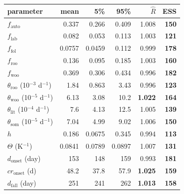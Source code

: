 \begin{tabular}[t]{lrrrrr}
\toprule
parameter & mean & 5\% & 95\% & $\hat R$ & ESS \\
\midrule
$f_\text{auto}$ & 0.337 & 0.266 & 0.409 & 1.008 & \textbf{150} \\
$f_\text{lab}$ & 0.082 & 0.053 & 0.113 & 1.003 & \textbf{121} \\
$f_\text{fol}$ & 0.0757 & 0.0459 & 0.112 & 0.999 & \textbf{178} \\
$f_\text{roo}$ & 0.136 & 0.095 & 0.185 & 1.003 & \textbf{160} \\
$f_\text{woo}$ & 0.369 & 0.306 & 0.434 & 0.996 & \textbf{182} \\
$\theta_\text{roo}$ (10$^{-3}$ d$^{-1}$) & 1.84 & 0.863 & 3.43 & 0.996 & \textbf{123} \\
$\theta_\text{woo}$ (10$^{-5}$ d$^{-1}$) & 6.13 & 3.08 & 10.2 & \textbf{1.022} & \textbf{164} \\
$\theta_\text{lit}$ (10$^{-4}$ d$^{-1}$) & 7.6 & 4.13 & 12.5 & 1.005 & \textbf{139} \\
$\theta_\text{som}$ (10$^{-5}$ d$^{-1}$) & 7.04 & 4.99 & 9.02 & 1.006 & \textbf{150} \\
$h$ & 0.186 & 0.0675 & 0.345 & 0.994 & \textbf{113} \\
$\Theta$ (K$^{-1}$) & 0.0841 & 0.0789 & 0.0897 & 1.007 & \textbf{131} \\
$d_\text{onset}$ (day) & 153 & 148 & 159 & 0.993 & \textbf{181} \\
$cr_\text{onset}$ (d) & 48.2 & 37.8 & 57.9 & \textbf{1.025} & \textbf{159} \\
$d_\text{fall}$ (day) & 251 & 241 & 262 & \textbf{1.013} & \textbf{158} \\
\bottomrule
\end{tabular}
